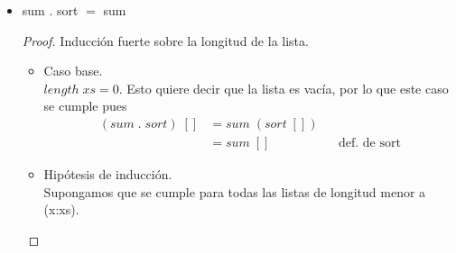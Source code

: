 \documentclass[letterpaper,11pt]{article}
\begin{document}
\begin{enumerate}
\begin{itemize}
\begin{proof}
\begin{itemize}
                \item Hipótesis de inducción.
                \begin{center}
                    sum . map sum $=$ sum . concat
                \end{center}

                \item Paso inductivo.
                \begin{align*}
                    (sum \; . \; map \; sum) \; (x:xs)
                    &= sum \; (map \; sum \; (x:xs)) \\
                    &= sum \; (sum \; x \; : \; map \; sum \; xs) \\
                    &= sum \; x + sum \; (map \; sum \; xs)
                    && \text{def. de sum} \\ 
                    &= sum \; x + sum \; (concat \; xs)
                    && \text{hipótesis de inducción} \\ 
                    &= sum \; (x \; ++ \; concat \; xs)
                    && \text{propiedad de sum} \\ 
                    &= sum \; (concat (x:xs))
                    && \text{def. de concat} \\ 
                    &= (sum \; . \; concat) \; (x:xs)
                \end{align*}
            \end{itemize}
        \end{proof}

        \item sum . sort $=$ sum
        \begin{proof}
            Inducción fuerte sobre la longitud de la lista.
            \begin{itemize}
                \item Caso base. \\ 
                $length \; xs = 0$. Esto quiere decir que la lista es vacía,
                por lo que este caso se cumple pues 
                \begin{align*}
                    (sum \; . \; sort) \; [] 
                    &= sum \; (sort \; []) \\ 
                    &= sum \; []
                    && \text{def. de sort} 
                \end{align*}

                \item Hipótesis de inducción. \\
                Supongamos que se cumple para todas las listas de longitud 
                menor a (x:xs).


\end{itemize}
\end{proof}
\end{itemize}
\end{enumerate}
\end{document}
